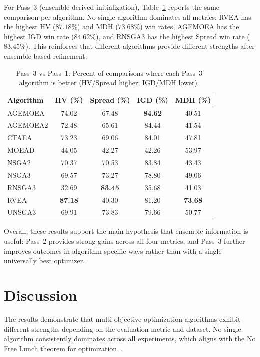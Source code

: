 \documentclass[sigconf,authorversion,nonacm]{acmart}
\begin{document}
For Pass~3 (ensemble-derived initialization), Table~\ref{tab:pass3-vs-pass1} 
reports the same comparison per algorithm. No single algorithm dominates all 
metrics: RVEA has the highest HV ($87.18\%$) and MDH ($73.68\%$) win rates, 
AGEMOEA has the highest IGD win rate ($84.62\%$), and RNSGA3 has the highest 
Spread win rate ($83.45\%$). This reinforces that different algorithms provide 
different strengths after ensemble-based refinement.

\begin{table}[h]
\centering
\caption{Pass~3 vs Pass~1: Percent of comparisons where each Pass~3 algorithm is better (HV/Spread higher; IGD/MDH lower).}
\label{tab:pass3-vs-pass1}
\begin{tabular}{lcccc}
\hline
Algorithm & HV (\%) & Spread (\%) & IGD (\%) & MDH (\%) \\
\hline
AGEMOEA  & 74.02 & 67.48 & \textbf{84.62} & 40.51 \\
AGEMOEA2 & 72.48 & 65.61 & 84.44 & 41.54 \\
CTAEA    & 73.23 & 69.06 & 84.01 & 47.81 \\
MOEAD    & 44.05 & 42.27 & 42.26 & 53.97 \\
NSGA2    & 70.37 & 70.53 & 83.84 & 43.43 \\
NSGA3    & 69.57 & 73.27 & 78.80 & 49.06 \\
RNSGA3   & 32.69 & \textbf{83.45} & 35.68 & 41.03 \\
RVEA     & \textbf{87.18} & 40.30 & 81.20 & \textbf{73.68} \\
UNSGA3   & 69.91 & 73.83 & 79.66 & 50.77 \\
\hline
\end{tabular}
\end{table}

Overall, these results support the main hypothesis that ensemble information 
is useful: Pass~2 provides strong gains across all four metrics, and Pass~3 
further improves outcomes in algorithm-specific ways rather than with a single 
universally best optimizer.

\section{Discussion}

The results demonstrate that multi-objective optimization algorithms 
exhibit different strengths depending on the evaluation metric and 
dataset. No single algorithm consistently dominates across all 
experiments, which aligns with the No Free Lunch theorem for optimization~\cite{wolpert1997nfl}.
\end{document}
